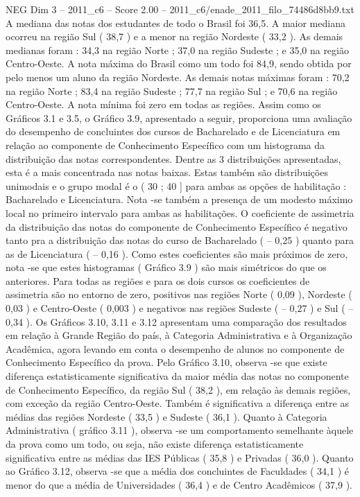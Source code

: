 \begin{textsample}{NEG Dim 3 – 2011\_c6 – Score 2.00 – 2011\_c6/enade\_2011\_filo\_74486d8bb9.txt}
A mediana das notas dos estudantes de todo o Brasil foi 36,5.
A maior mediana ocorreu na região Sul ( 38,7 ) e a menor na região Nordeste ( 33,2 ).
As demais medianas foram : 34,3 na região Norte ; 37,0 na região Sudeste ; e 35,0 na região Centro-Oeste.
A nota máxima do Brasil como um todo foi 84,9, sendo obtida por pelo menos um aluno da região Nordeste.
As demais notas máximas foram : 70,2 na região Norte ; 83,4 na região Sudeste ; 77,7 na região Sul ; e 70,6 na região Centro-Oeste.
A nota mínima foi zero em todas as regiões.
Assim como os Gráficos 3.1 e 3.5, o Gráfico 3.9, apresentado a seguir, proporciona uma avaliação do desempenho de concluintes dos cursos de Bacharelado e de Licenciatura em relação ao componente de Conhecimento Específico com um histograma da distribuição das notas correspondentes.
Dentre as 3 distribuições apresentadas, esta é a mais concentrada nas notas baixas.
Estas também são distribuições unimodais e o grupo modal é o ( 30 ; 40 ] para ambas as opções de habilitação : Bacharelado e Licenciatura.
Nota -se também a presença de um modesto máximo local no primeiro intervalo para ambas as habilitações.
O coeficiente de assimetria da distribuição das notas do componente de Conhecimento Específico é negativo tanto pra a distribuição das notas do curso de Bacharelado ( – 0,25 ) quanto para as de Licenciatura ( – 0,16 ).
Como estes coeficientes são mais próximos de zero, nota -se que estes histogramas ( Gráfico 3.9 ) são mais simétricos do que os anteriores.
Para todas as regiões e para os dois cursos os coeficientes de assimetria são no entorno de zero, positivos nas regiões Norte ( 0,09 ), Nordeste ( 0,03 ) e Centro-Oeste ( 0,003 ) e negativos nas regiões Sudeste ( – 0,27 ) e Sul ( – 0,34 ).
Os Gráficos 3.10, 3.11 e 3.12 apresentam uma comparação dos resultados em relação à Grande Região do país, à Categoria Administrativa e à Organização Acadêmica, agora levando em conta o desempenho de alunos no componente de Conhecimento Específico da prova.
Pelo Gráfico 3.10, observa -se que existe diferença estatisticamente significativa da maior média das notas no componente de Conhecimento Específico, da região Sul ( 38,2 ), em relação às demais regiões, com exceção da região Centro-Oeste.
Também é significativa a diferença entre as médias das regiões Nordeste ( 33,5 ) e Sudeste ( 36,1 ).
Quanto à Categoria Administrativa ( gráfico 3.11 ), observa -se um comportamento semelhante àquele da prova como um todo, ou seja, não existe diferença estatisticamente significativa entre as médias das IES Públicas ( 35,8 ) e Privadas ( 36,0 ).
Quanto ao Gráfico 3.12, observa -se que a média dos concluintes de Faculdades ( 34,1 ) é menor do que a média de Universidades ( 36,4 ) e de Centro Acadêmicos ( 37,9 ).

\end{textsample}
